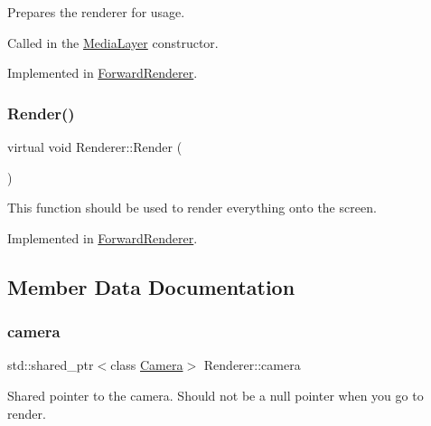 Prepares the renderer for usage.

Called in the \hyperlink{class_media_layer}{Media\+Layer} constructor.

Implemented in \hyperlink{class_forward_renderer_a5cbca647822780d6cfbd39552d73ee06}{Forward\+Renderer}.

\hypertarget{class_renderer_a38623da22aa718cfa41e2514ebd269f5}{}\label{class_renderer_a38623da22aa718cfa41e2514ebd269f5}
\subsubsection{\texorpdfstring{Render()}{Render()}}
{\footnotesize\ttfamily virtual void Renderer\+::\+Render (\begin{DoxyParamCaption}{ }\end{DoxyParamCaption})\hspace{0.3cm}{\ttfamily [pure virtual]}}



This function should be used to render everything onto the screen.



Implemented in \hyperlink{class_forward_renderer_a1a5deafa5deaf1e0abaab0e2074928c1}{Forward\+Renderer}.



\subsection{Member Data Documentation}
\hypertarget{class_renderer_a7a08c6489c1ffe8e346b9f205b4014ca}{}\label{class_renderer_a7a08c6489c1ffe8e346b9f205b4014ca}
\subsubsection{\texorpdfstring{camera}{camera}}
{\footnotesize\ttfamily std\+::shared\+\_\+ptr$<$class \hyperlink{class_camera}{Camera}$>$ Renderer\+::camera\hspace{0.3cm}{\ttfamily [protected]}}



Shared pointer to the camera. Should not be a null pointer when you go to render.

\hypertarget{class_renderer_a65178695d48824d3afd6fe40fd4915b6}{}\label{class_renderer_a65178695d48824d3afd6fe40fd4915b6}
